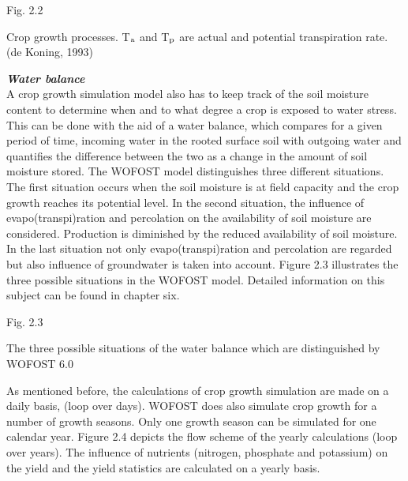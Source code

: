 \bigskip
\begin{figure}[htbp]
 \begin{center} \end{center}
\end{figure}
Fig. 2.2
\testlastline

\begin{indenting}{2.54cm}
Crop growth pro\-cesses. {\small T$_{{\rm a}}$ and T$_{{\rm p}}$ are actual and potential transpiration rate.} (de
Koning, 1993)
\end{indenting}

\bigskip
{\bf {\it Water balance\/}}\\
A crop growth simulation model also has to keep track of the soil moisture content to
deter\-mine when and to what degree a crop is exposed to water stress. This can be done
with the aid of a water balance, which com\-pares for a given period of time, incoming
water in the rooted surface soil with outgoing water and quantifies the difference between
the two as a change in the amount of soil moisture {\nobreak}stored. The WOFOST model distin\-guishes three different situations. The first situation occurs when the soil moisture is at
field capacity and the crop growth reaches its potential level. In the second situation, the
influence of evapo(transpi)rati\-on and percolation on the availability of soil moisture are
considered. Production is dimin\-ished by the reduced availability of soil moisture. In the
last situation not only evapo(transpi)ration and percola\-tion are regarded but also influence
of groundwater is taken into account. Figure 2.3 illustrates the three possible situations in
the WOFOST model. Detailed information on this subject can be found in chapter six.

\bigskip
\begin{figure}[htbp]
 \begin{center} \end{center}
\end{figure}

\bigskip
\bigskip
\bigskip
\bigskip
\bigskip
\bigskip
  \bigskip
Fig. 2.3
\testlastline

\begin{indenting}{2.54cm}
The three possible situations of the water balance which are distin\-guished
by WOFOST 6.0
\end{indenting}

\bigskip
As mentioned before, the calculations of crop growth simulation are made on a daily
basis, (loop over days). WOFOST does also simulate crop growth for a number of growth
seasons. Only one growth season can be simulated for one cal\-endar year. Figure 2.4
depicts the flow scheme of the yearly calculations (loop over years). The influ\-ence of
nutrients (nitrogen, phos\-phate and potassi\-um) on the yield and the yield statistics are
calculated on a yearly basis.


